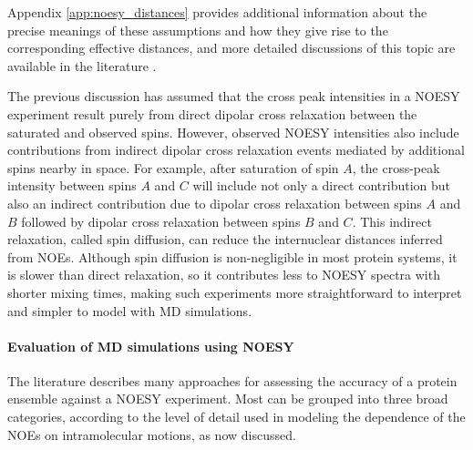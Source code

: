\documentclass[9pt,review]{livecoms}
\begin{document}
\noindent Appendix \ref{app:noesy_distances} provides additional information about the precise meanings of these assumptions and how they give rise to the corresponding effective distances, and more detailed discussions of this topic are available in the literature \cite{neuhaus_nuclear_2000,vogeli_nuclear_2014}.

The previous discussion has assumed that the cross peak intensities in a NOESY experiment result purely from direct dipolar cross relaxation between the saturated and observed spins.
However, observed NOESY intensities also include contributions from indirect dipolar cross relaxation events mediated by additional spins nearby in space.
For example, after saturation of spin $A$, the cross-peak intensity between spins $A$ and $C$ will include not only a direct contribution but also an indirect contribution due to dipolar cross relaxation between spins $A$ and $B$ followed by dipolar cross relaxation between spins $B$ and $C$.
This indirect relaxation, called spin diffusion, can reduce the internuclear distances inferred from NOEs. 
Although spin diffusion is non-negligible in most protein systems, it is slower than direct relaxation, so it contributes less to NOESY spectra with shorter mixing times, making such experiments more straightforward to interpret and simpler to model with MD simulations.

\paragraph{Evaluation of MD simulations using NOESY}

The literature describes many approaches for assessing the accuracy of a protein ensemble against a NOESY experiment.
Most can be grouped into three broad categories, according to the level of detail used in modeling the dependence of the NOEs on intramolecular motions, as now discussed.
\end{document}

